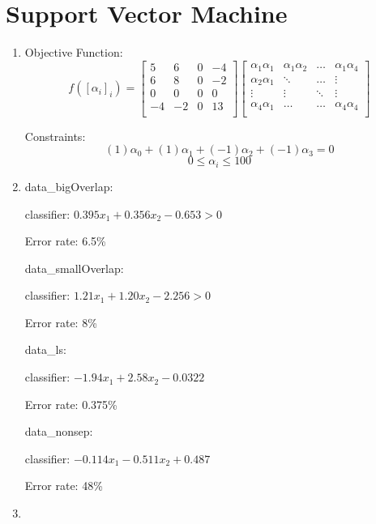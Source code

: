 \documentclass{paper}
\begin{document}
\section{Support Vector Machine}

\begin{enumerate}
    \item

    Objective Function:
    \begin{equation*}
f([\alpha_i]_i) = \begin{bmatrix}
5 & 6 & 0 & -4 \\
6 & 8 & 0 & -2 \\
0 & 0 & 0 & 0 \\
-4 & -2 & 0 & 13 \\
    \end{bmatrix} \begin{bmatrix}
\alpha_1\alpha_1 & \alpha_1\alpha_2 & \hdots & \alpha_1\alpha_4 \\
\alpha_2\alpha_1 & \ddots & \hdots & \vdots \\
\vdots & \vdots & \ddots & \vdots \\
\alpha_4\alpha_1 & \hdots & \hdots & \alpha_4\alpha_4 \\
    \end{bmatrix}
 \end{equation*}

Constraints:
\[
(1)\alpha_0 +
(1)\alpha_1 +
(-1)\alpha_2 +
(-1)\alpha_3 = 0 \]
\[  0 \le \alpha_i \le 100 \]

    \item 
data\_bigOverlap:

    classifier: $0.395 x_1 + 0.356 x_2 - 0.653 > 0$

Error rate: 6.5\%



data\_smallOverlap:

classifier:  $1.21 x_1 + 1.20 x_2 - 2.256 > 0$

Error rate: 8\%



data\_ls:

classifier: $-1.94 x_1 + 2.58 x_2 - 0.0322$

Error rate: 0.375\%



data\_nonsep:

classifier: $-0.114 x_1 -0.511 x_2 + 0.487$

Error rate: 48\%

    \item


\end{enumerate}
\end{document}
